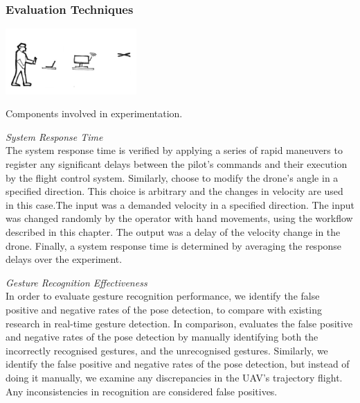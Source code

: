
\subsubsection{Evaluation Techniques}

\begin{marginfigure}%
  \vspace{1cm}
  \includegraphics[width=5cm]{images/intro/step2_diagram.png}
  \caption{Components involved in experimentation.}
  \label{fig:hand_piloting}
\end{marginfigure}
 \textit{System Response Time}\\
The system response time is verified by applying a series of rapid maneuvers to register any significant delays between the pilot’s commands and their execution by the flight control system. Similarly,  \cite{experimental_tuning} choose to modify the drone’s angle in a specified direction. This choice is arbitrary and the changes in velocity are used in this case.The input was a demanded velocity in a specified direction. The input was changed randomly by the operator with hand movements, using the workflow described in this chapter. The output was a delay of the velocity change in the drone. Finally, a system response time is determined by averaging the response delays over the experiment. 

\textit{Gesture Recognition Effectiveness}\\
In order to evaluate gesture recognition performance, we identify the false positive and negative rates of the pose detection, to compare with existing research in real-time gesture detection. In comparison,  \cite{bolin_crawford_macke_hoffman_beckmann_sen_2017} evaluates the false positive and negative rates of the pose detection by manually identifying both the incorrectly recognised gestures, and the unrecognised gestures. Similarly, we identify the false positive and negative rates of the pose detection, but instead of doing it manually, we examine any discrepancies in the UAV’s trajectory flight. Any inconsistencies in recognition are considered false positives.

